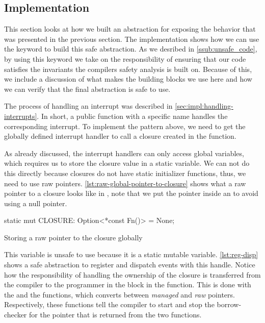\subsection{Implementation}

This section looks at how we built an abstraction for exposing the behavior that was presented in the previous section.
The implementation shows how we can use the {\unsafe} keyword to build this safe abstraction.
As we desribed in \autoref{ssub:unsafe_code}, by using this keyword we take on the responsibility of ensuring that our code satisfies the invariants the compilers safety analysis is built on.
Because of this, we include a discussion of what makes the building blocks we use here {\unsafe} and how we can verify that the final abstraction is safe to use.

The process of handling an interrupt was described in \autoref{sec:impl:handling-interrupts}.
In short, a public function with a specific name handles the corresponding interrupt.
To implement the pattern above, we need to get the globally defined interrupt handler  to call a closure created in the  function.

As already discussed, the interrupt handlers can only access global variables, which requires us to store the closure value in a static variable.
We can not do this directly because closures do not have static initializer functions, thus, we need to use raw pointers.
\autoref{lst:raw-global-pointer-to-closure} shows what a raw pointer to a closure looks like in {\rust}, note that we put the pointer inside an  to avoid using a null pointer.

\begin{listing}[H]
  \begin{rustcode}
static mut CLOSURE: Option<*const Fn()> = None;
  \end{rustcode}
  \caption{Storing a raw pointer to the closure globally}
  \label{lst:raw-global-pointer-to-closure}
\end{listing}

This  variable is unsafe to use because it is a static mutable variable.
\autoref{lst:reg-disp} shows a safe abstraction to register and dispatch events with this handle.
Notice how the responsibility of handling the ownership of the closure is transferred from the compiler to the programmer in the {\unsafe} block in the  function.
This is done with the  and the  functions, which converts between \emph{managed} and \emph{raw} pointers.
Respectively, these functions tell the compiler to start and stop the borrow-checker for the pointer that is returned from the two functions.

